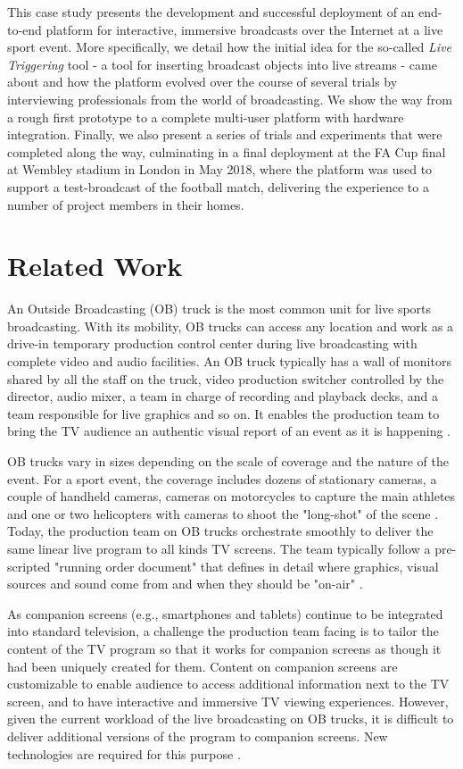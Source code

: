 \documentclass[sigchi-a, authorversion]{acmart}
\begin{document}
 This case study presents the development and successful deployment of an end-to-end platform for interactive, immersive broadcasts over the Internet at a live sport event. More specifically, we detail how the initial idea for the so-called \emph{Live Triggering} tool - a tool for inserting broadcast objects into live streams - came about and how the platform evolved over the course of several trials by interviewing professionals from the world  of broadcasting. We show the way from a rough first prototype to a complete multi-user platform with hardware integration. Finally, we also present a series of trials and experiments that were completed along the way,  culminating in a final deployment at the FA Cup final at Wembley stadium in London in May 2018, where the platform was used to support a test-broadcast of the football match, delivering the experience to a number of project members in their homes.

\section{Related Work}
An Outside Broadcasting (OB) truck is the most common unit for live sports broadcasting. With its mobility, OB trucks can access any location and work as a drive-in temporary production control center during live broadcasting with complete video and audio facilities. An OB truck typically has a wall of monitors shared by all the staff on the truck, video production switcher controlled by the director, audio mixer, a team in charge of recording and playback decks, and a team responsible for live graphics and so on. It enables the production team to bring the TV audience an authentic visual report of an event as it is happening \cite{owens2012, owens2015}.

OB trucks vary in sizes depending on the scale of coverage and the nature of the event. For a sport event, the coverage includes dozens of stationary cameras, a couple of handheld cameras, cameras on motorcycles to capture the main athletes and one or two helicopters with cameras to shoot the "long-shot" of the scene \cite{owens2012, li2018}. Today, the production team on OB trucks orchestrate smoothly to deliver the same linear live program to all kinds TV screens. The team typically follow a pre-scripted "running order document" that defines in detail where graphics, visual sources and sound come from and when they should be "on-air" \cite{li2018}. 

As companion screens (e.g., smartphones and tablets) continue to be integrated into standard television, a challenge the production team facing is to tailor the content of the TV program so that it works for companion screens as though it had been uniquely created for them. Content on companion screens are customizable to enable audience to access additional information next to the TV screen, and to have interactive and immersive TV viewing experiences\cite{bentley2017, dowell2015}. However, given the current workload of the live broadcasting on OB trucks, it is difficult to deliver additional versions of the program to companion screens. New technologies are required for this purpose \cite{li2018, armstrong2014}.
\end{document}
